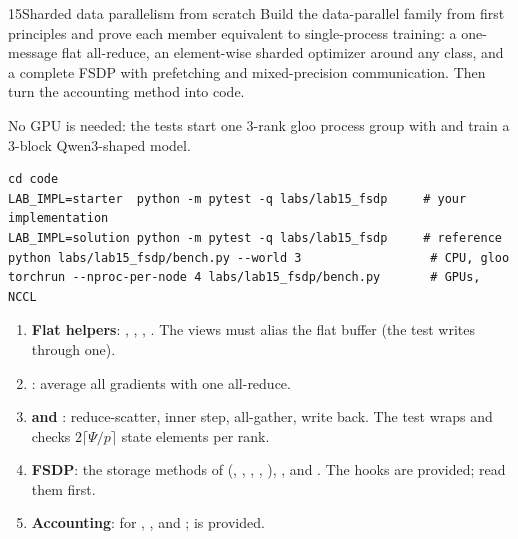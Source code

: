 \begin{labbox}{15}{Sharded data parallelism from scratch}
Build the data-parallel family from first principles and prove each member equivalent to
single-process training: a one-message flat all-reduce, an element-wise sharded optimizer
around any  class, and a complete FSDP with prefetching and mixed-precision
communication. Then turn the accounting method into code.

No GPU is needed: the tests start one 3-rank gloo process group with
 and train a 3-block Qwen3-shaped model.
\begin{lstlisting}[style=shell]
cd code
LAB_IMPL=starter  python -m pytest -q labs/lab15_fsdp     # your implementation
LAB_IMPL=solution python -m pytest -q labs/lab15_fsdp     # reference
python labs/lab15_fsdp/bench.py --world 3                  # CPU, gloo
torchrun --nproc-per-node 4 labs/lab15_fsdp/bench.py       # GPUs, NCCL
\end{lstlisting}

\begin{enumerate}
  \item \textbf{Flat helpers}: , ,
    , . The views must alias the flat buffer (the test
    writes through one).
  \item \textbf{}: average all gradients with one all-reduce.
  \item \textbf{ and }: reduce-scatter, inner
    step, all-gather, write back. The test wraps  and checks
    $2\lceil\Psi/p\rceil$ state elements per rank.
  \item \textbf{FSDP}: the storage methods of  (,
    , , , ),
    ,  and
    . The hooks are provided; read them first.
  \item \textbf{Accounting}:  for , ,
     and ;  is provided.
\end{enumerate}


\end{labbox}
